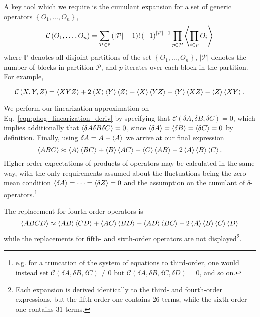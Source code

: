 A key tool which we require is the cumulant expansion for a set of generic operators $\left\{ O_1, \dots, O_n\right\}$, 
\begin{equation}
\mathcal{C}\left(O_1, \dots, O_n\right) = \sum_{\mathcal{P}\in \mathbb{P}} \left(\left|\mathcal{P}\right| - 1\right)! \left(-1\right)^{\left|\mathcal{P}\right|-1} \prod_{p \in \mathcal{P}} \ev{\prod_{i \in p} O_i}
\end{equation}
where $\mathbb{P}$ denotes all disjoint partitions of the set $\left\{O_1, \dots, O_n\right\}$, $\left| \mathcal{P}\right|$ denotes the number of blocks in partition $\mathcal{P}$, and $p$ iterates over each block in the partition. For example,

\begin{equation}
\mathcal{C} \left(X, Y, Z\right) = \ev{X Y Z} + 2 \ev{X}\ev{Y}\ev{Z} - \ev{X}\ev{Y Z} - \ev{Y}\ev{X Z} - \ev{Z}\ev{X Y}.
\end{equation}

\noindent We perform our linearization approximation on Eq.~\ref{eqn:phog_linearization_deriv} by specifying that $\mathcal{C}\left(\delta A, \delta B, \delta C \right) = 0$, which implies additionally that $\ev{\delta A \delta B \delta C} = 0$, since $\ev{\delta A} = \ev{\delta B} = \ev{\delta C} = 0$ by definition. Finally, using $\delta A = A - \ev{A}$ we arrive at our final expression
\begin{equation}\label{eqn:linearization_3}
\ev{A B C} \approx \ev{A} \ev{B C} + \ev{B} \ev{A C} + \ev{C} \ev{A B} - 2 \ev{A} \ev{B} \ev{C}.
\end{equation}
Higher-order expectations of products of operators may be calculated in the same way, with the only requirements assumed about the fluctuations being the zero-mean condition $\ev{\delta A} = \dots = \ev{\delta Z} = 0$ and the assumption on the cumulant of $\delta$-operators.\footnote{e.g. for a truncation of the system of equations to third-order, one would instead set $\mathcal{C}\left(\delta A, \delta B, \delta C\right) \ne 0$ but $\mathcal{C}\left(\delta A, \delta B, \delta C , \delta D\right) = 0$, and so on.}

The replacement for fourth-order operators is
\begin{equation}
\ev{A B C D} \approx \ev{A B}\ev{C D} + \ev{A C}\ev{B D} + \ev{A D}\ev{B C} - 2 \ev{A}\ev{B}\ev{C}\ev{D}
\end{equation}
while the replacements for fifth- and sixth-order operators are not displayed\footnote{Each expansion is derived identically to the third- and fourth-order expressions, but the fifth-order one contains $26$ terms, while the sixth-order one contains $31$ terms.}. 

